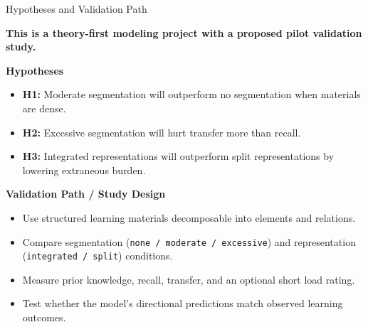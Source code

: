 \documentclass{beamer}
\begin{document}
\begin{frame}[t]{Hypotheses and Validation Path}

\textbf{This is a theory-first modeling project with a proposed pilot validation study.}

\vspace{0.4em}
\textbf{Hypotheses}
\begin{itemize}
\setlength{\itemsep}{0.15em}
\item \textbf{H1:} Moderate segmentation will outperform no segmentation when materials are dense.
\item \textbf{H2:} Excessive segmentation will hurt transfer more than recall.
\item \textbf{H3:} Integrated representations will outperform split representations by lowering extraneous burden.
\end{itemize}

\vspace{0.2em}
\textbf{Validation Path / Study Design}
\begin{itemize}
\setlength{\itemsep}{0.15em}
\item Use structured learning materials decomposable into elements and relations.
\item Compare segmentation (\texttt{none / moderate / excessive}) and representation (\texttt{integrated / split}) conditions.
\item Measure prior knowledge, recall, transfer, and an optional short load rating.
\item Test whether the model's directional predictions match observed learning outcomes.
\end{itemize}

\end{frame}
\end{document}
